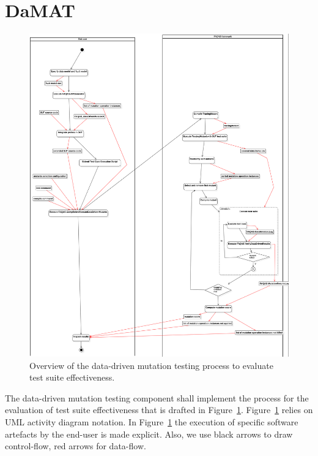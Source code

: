 
\section{DaMAT}

\begin{figure}[h]
  \centering
	\includegraphics[width=\textwidth]{images/png/Activity1!DataDrivenTestSuiteEvaluation_3.png}
      \caption{Overview of the data-driven mutation testing process to evaluate test suite effectiveness.}
      \label{fig:process:dataDriven:evaluation}
\end{figure}

The data-driven mutation testing component shall implement the process for the evaluation of test suite effectiveness that is drafted in Figure~\ref{fig:process:dataDriven:evaluation}. Figure~\ref{fig:process:dataDriven:evaluation} relies on UML activity diagram notation. In Figure~\ref{fig:process:dataDriven:evaluation} the execution of specific software artefacts by the end-user is made explicit. Also, we use black arrows to draw control-flow, red arrows for data-flow. 

